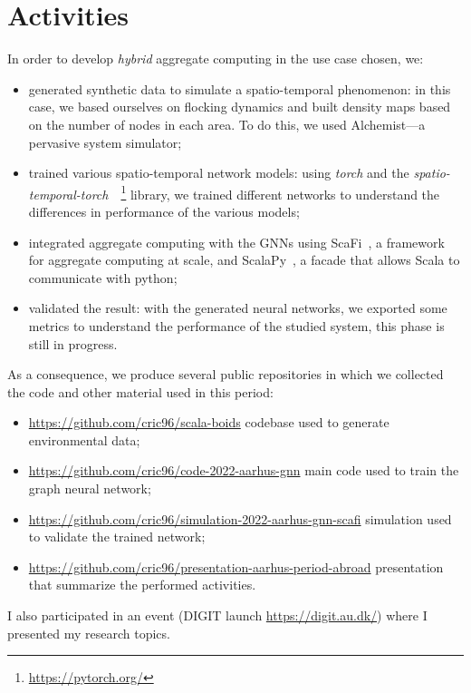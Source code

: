 \documentclass{article}
\begin{document}
\section{Activities}
In order to develop \emph{hybrid} aggregate computing in the use case chosen, we:
\begin{itemize}
\item generated synthetic data to simulate a spatio-temporal phenomenon: in this case, we based ourselves on flocking dynamics and built density maps based on the number of nodes in each area. To do this, we used Alchemist---a pervasive system simulator;
\item trained various spatio-temporal network models: using \emph{torch} and the \emph{spatio-temporal-torch}~\cite{rozemberczki2021pytorch}~\footnote{\url{https://pytorch.org/}} library, we trained different networks to understand the differences in performance of the various models;
\item integrated aggregate computing with the GNNs using ScaFi~\cite{casadei2022scafi}, a framework for aggregate computing at scale, and ScalaPy~\cite{laddad2020scalapy}, a facade that allows Scala to communicate with python;
\item validated the result: with the generated neural networks, we exported some metrics to understand the performance of the studied system, this phase is still in progress.
\end{itemize}
As a consequence, we produce several public repositories in which we collected the code and other material used in this period:
\begin{itemize}
\item \url{https://github.com/cric96/scala-boids} codebase used to generate environmental data;
\item \url{https://github.com/cric96/code-2022-aarhus-gnn} main code used to train the graph neural network;
\item \url{https://github.com/cric96/simulation-2022-aarhus-gnn-scafi} simulation used to validate the trained network;
\item \url{https://github.com/cric96/presentation-aarhus-period-abroad} presentation that summarize the performed activities.
\end{itemize}
I also participated in an event (DIGIT launch \url{https://digit.au.dk/}) where I presented my research topics.
\end{document}
